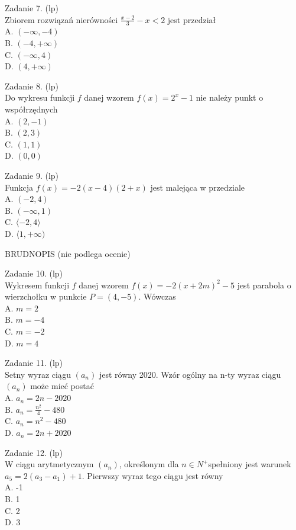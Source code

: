 \documentclass[10pt]{article}
\begin{document}
Zadanie 7. (lp)\\
Zbiorem rozwiązań nierówności \(\frac{x-2}{3}-x<2\) jest przedział\\
A. \((-\infty,-4)\)\\
B. \((-4,+\infty)\)\\
C. \((-\infty, 4)\)\\
D. \((4,+\infty)\)

Zadanie 8. (lp)\\
Do wykresu funkcji \(f\) danej wzorem \(f(x)=2^{x}-1\) nie należy punkt o współrzędnych\\
A. \((2,-1)\)\\
B. \((2,3)\)\\
C. \((1,1)\)\\
D. \((0,0)\)

Zadanie 9. (lp)\\
Funkcja \(f(x)=-2(x-4)(2+x)\) jest malejąca w przedziale\\
A. \((-2,4)\)\\
B. \((-\infty, 1)\)\\
C. \(\langle-2,4\rangle\)\\
D. \(\langle 1,+\infty)\)

BRUDNOPIS (nie podlega ocenie)

Zadanie 10. (lp)\\
Wykresem funkcji \(f\) danej wzorem \(f(x)=-2(x+2 m)^{2}-5\) jest parabola o wierzchołku w punkcie \(P=(4,-5)\). Wówczas\\
A. \(m=2\)\\
B. \(m=-4\)\\
C. \(m=-2\)\\
D. \(m=4\)

Zadanie 11. (lp)\\
Setny wyraz ciągu \(\left(a_{n}\right)\) jest równy 2020. Wzór ogólny na n-ty wyraz ciągu \(\left(a_{n}\right)\) może mieć postać\\
A. \(a_{n}=2 n-2020\)\\
B. \(a_{n}=\frac{n^{2}}{4}-480\)\\
C. \(a_{n}=n^{2}-480\)\\
D. \(a_{n}=2 n+2020\)

Zadanie 12. (lp)\\
W ciągu arytmetycznym \(\left(a_{n}\right)\), określonym dla \(n \in N^{+}\)spełniony jest warunek \(a_{5}=2\left(a_{3}-a_{1}\right)+1\). Pierwszy wyraz tego ciągu jest równy\\
A. -1\\
B. 1\\
C. 2\\
D. 3
\end{document}
